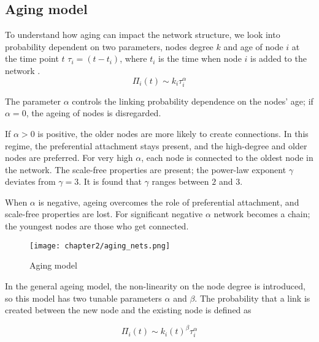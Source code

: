 \subsection{Aging model}

To understand how aging can impact the network structure, we look into probability dependent on two parameters, nodes degree $k$ and age of node $i$ at the time point $t$ $\tau_i=(t-t_i)$, where $t_i$ is the time when node $i$ is added to the network \cite{dorogovtsev2000b}. 
\begin{equation}
\Pi_{i}(t)\sim k_{i}\tau_{i}^{\alpha} 
\label{eq:aging}
\end{equation}

The parameter $\alpha$ controls the linking probability dependence on the nodes' age; if $\alpha=0$, the ageing of nodes is disregarded. 

If $\alpha>0$ is positive, the older nodes are more likely to create connections. In this regime, the preferential attachment stays present, and the high-degree and older nodes are preferred. For very high $\alpha$, each node is connected to the oldest node in the network. The scale-free properties are present; the power-law exponent $\gamma$ deviates from $\gamma=3$. It is found that $\gamma$ ranges between $2$ and $3$. 

When $\alpha$ is negative, ageing overcomes the role of preferential attachment, and scale-free properties are lost. For significant negative $\alpha$ network becomes a chain; the youngest nodes are those who get connected. 

\begin{figure}[h]
	\centering
	\texttt{[image: chapter2/aging\_nets.png]}
	\caption[Aging model]{Aging model}
	\label{fig:aging}
\end{figure}

In the general ageing model, the non-linearity on the node degree is introduced, so this model has two tunable parameters $\alpha $ and $\beta$. The probability that a link is created between the new node and the existing node is defined as \cite{hajra2004}

\begin{equation}
\Pi_{i}(t)\sim k_{i}(t)^{\beta}\tau_{i}^{\alpha} 
\label{eq:1}
\end{equation}

